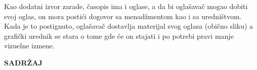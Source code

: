 \documentclass[a4paper,12pt]{extarticle}
\begin{document}
Kao dodatni izvor zarade, časopis ima i oglase, a da bi oglašavač mogao dobiti svoj oglas, on mora postići dogovor sa menadžmentom kao i sa uredništvom. Kada je to postignuto, oglašavač dostavlja materijal svog oglasa (obično sliku) a grafički urednik se stara o tome gde će on stajati i po potrebi pravi manje vizuelne izmene. \\







\newpage 
\begin{center}
	\textbf{\large SADRŽAJ}
\end{center}
\tableofcontents 

\newpage
\end{document}

